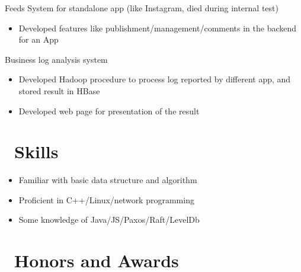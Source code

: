 \documentclass{resume}
\begin{document}
Feeds System for standalone app (like Instagram, died during internal test)
\begin{itemize}
  \item Developed features like publishment/management/comments in the backend for an App
\end{itemize}

Business log analysis system
\begin{itemize}
  \item Developed Hadoop procedure to process log reported by different app, and stored result in HBase
  \item Developed web page for presentation of the result
\end{itemize}



\section{\faCogs\ Skills}
\begin{itemize}[parsep=0.5ex]
  \item Familiar with basic data structure and algorithm
  \item Proficient in C++/Linux/network programming
  \item Some knowledge of Java/JS/Paxos/Raft/LevelDb
\end{itemize}

\section{\faHeartO\ Honors and Awards}


%
%
\end{document}
